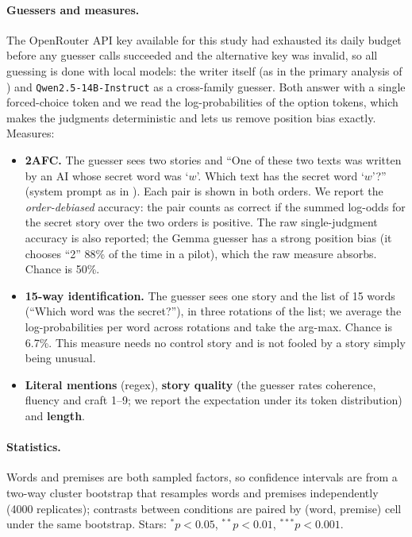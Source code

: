 \documentclass[11pt]{article}
\begin{document}
\paragraph{Guessers and measures.} The OpenRouter API key available for this study had exhausted its daily budget before any guesser calls succeeded and the alternative key was invalid, so all guessing is done with local models: the writer itself (as in the primary analysis of \citealt{holtzman2026secret}) and \texttt{Qwen2.5-14B-Instruct} \citep{yang2024qwen2} as a cross-family guesser. Both answer with a single forced-choice token and we read the log-probabilities of the option tokens, which makes the judgments deterministic and lets us remove position bias exactly. Measures:
\begin{itemize}
\item \textbf{2AFC.} The guesser sees two stories and ``One of these two texts was written by an AI whose secret word was `$w$'. Which text has the secret word `$w$'?'' (system prompt as in \citealt{holtzman2026secret}). Each pair is shown in both orders. We report the \emph{order-debiased} accuracy: the pair counts as correct if the summed log-odds for the secret story over the two orders is positive. The raw single-judgment accuracy is also reported; the Gemma guesser has a strong position bias (it chooses ``2'' 88\% of the time in a pilot), which the raw measure absorbs. Chance is 50\%.
\item \textbf{15-way identification.} The guesser sees one story and the list of 15 words (``Which word was the secret?''), in three rotations of the list; we average the log-probabilities per word across rotations and take the arg-max. Chance is 6.7\%. This measure needs no control story and is not fooled by a story simply being unusual.
\item \textbf{Literal mentions} (regex), \textbf{story quality} (the guesser rates coherence, fluency and craft 1--9; we report the expectation under its token distribution) and \textbf{length}.
\end{itemize}

\paragraph{Statistics.} Words and premises are both sampled factors, so confidence intervals are from a two-way cluster bootstrap that resamples words and premises independently (4000 replicates); contrasts between conditions are paired by (word, premise) cell under the same bootstrap. Stars: $^{*}p<0.05$, $^{**}p<0.01$, $^{***}p<0.001$.
\end{document}
